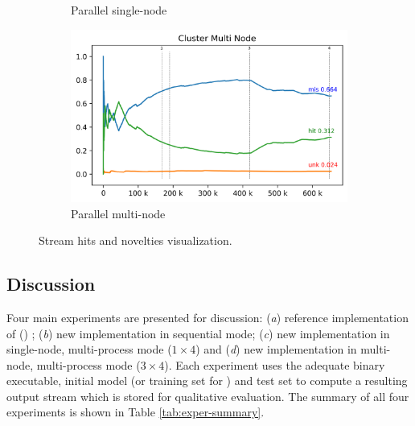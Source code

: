 \begin{figure}[hbt]
{\begin{subfigure}{.5\textwidth}
      \caption{Parallel single-node}
      \label{fig:cluster-sub-single}
    \end{subfigure}
    \begin{subfigure}{.5\textwidth}
      \centering
      \includegraphics[width=\linewidth]{tmi-n12.log.png}
      \caption{Parallel multi-node}
      \label{fig:cluster-sub-multi}
    \end{subfigure}
  }
  \caption{Stream hits and novelties visualization.}
  \label{fig:visualization}
\end{figure}


\subsection{Discussion}

Four main experiments are presented for discussion:
(\emph{a}) reference implementation of \minas () \cite{Faria2016minas};
(\emph{b}) new implementation in sequential mode;
(\emph{c}) new implementation in single-node, multi-process mode ($1\times4$) and
(\emph{d}) new implementation in multi-node, multi-process mode ($3\times4$).
Each experiment uses the adequate binary executable, initial model
(or training set for ) and test set
to compute a resulting output stream which is stored for qualitative evaluation.
The summary of all four experiments is shown in Table \ref{tab:exper-summary}.

